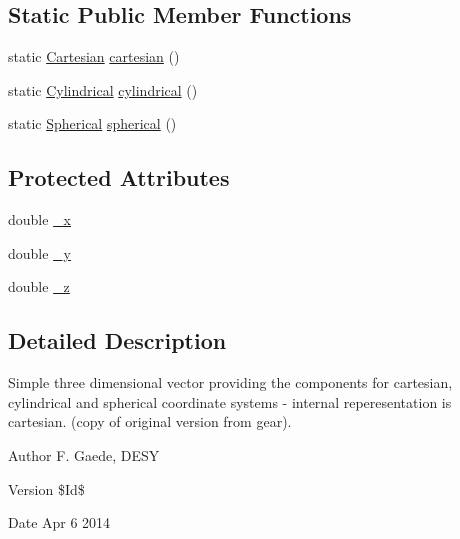 \subsection*{Static Public Member Functions}
\begin{DoxyCompactItemize}
\item 
static \hyperlink{struct_d_d_surfaces_1_1_vector3_d_1_1_cartesian}{Cartesian} \hyperlink{class_d_d_surfaces_1_1_vector3_d_a983814268a129992e3010f4964cd2b63}{cartesian} ()
\item 
static \hyperlink{struct_d_d_surfaces_1_1_vector3_d_1_1_cylindrical}{Cylindrical} \hyperlink{class_d_d_surfaces_1_1_vector3_d_aa9467dc445dfa66633113f4d17dd3be8}{cylindrical} ()
\item 
static \hyperlink{struct_d_d_surfaces_1_1_vector3_d_1_1_spherical}{Spherical} \hyperlink{class_d_d_surfaces_1_1_vector3_d_a2c73305f5aef051f55f33b721a68b660}{spherical} ()
\end{DoxyCompactItemize}
\subsection*{Protected Attributes}
\begin{DoxyCompactItemize}
\item 
double \hyperlink{class_d_d_surfaces_1_1_vector3_d_a9891648fe605155ece38f3b9c9dd687d}{\+\_\+x}
\item 
double \hyperlink{class_d_d_surfaces_1_1_vector3_d_a69ad9a281ca55cd4b1e9959265855a97}{\+\_\+y}
\item 
double \hyperlink{class_d_d_surfaces_1_1_vector3_d_a8cfed9e9ca399b20c9b4d3bbb5692bc9}{\+\_\+z}
\end{DoxyCompactItemize}


\subsection{Detailed Description}
Simple three dimensional vector providing the components for cartesian, cylindrical and spherical coordinate systems -\/ internal reperesentation is cartesian. (copy of original version from gear).

\begin{DoxyAuthor}{Author}
F. Gaede, D\+E\+SY 
\end{DoxyAuthor}
\begin{DoxyVersion}{Version}
\$\+Id\$ 
\end{DoxyVersion}
\begin{DoxyDate}{Date}
Apr 6 2014 
\end{DoxyDate}


